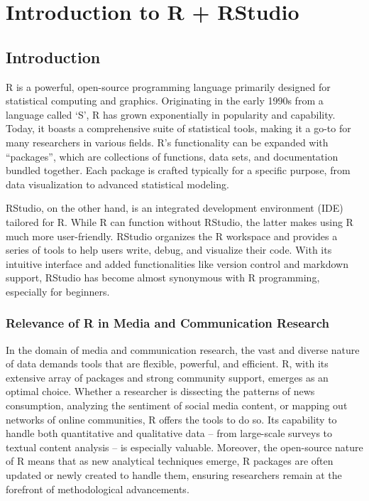 \documentclass[
  b5paper]{book}
\begin{document}
\hypertarget{introduction-to-r-rstudio}{%
\chapter{Introduction to R + RStudio}\label{introduction-to-r-rstudio}}

\hypertarget{introduction-4}{%
\section{Introduction}\label{introduction-4}}

R is a powerful, open-source programming language primarily designed for statistical computing and graphics. Originating in the early 1990s from a language called `S', R has grown exponentially in popularity and capability. Today, it boasts a comprehensive suite of statistical tools, making it a go-to for many researchers in various fields. R's functionality can be expanded with ``packages'', which are collections of functions, data sets, and documentation bundled together. Each package is crafted typically for a specific purpose, from data visualization to advanced statistical modeling.

RStudio, on the other hand, is an integrated development environment (IDE) tailored for R. While R can function without RStudio, the latter makes using R much more user-friendly. RStudio organizes the R workspace and provides a series of tools to help users write, debug, and visualize their code. With its intuitive interface and added functionalities like version control and markdown support, RStudio has become almost synonymous with R programming, especially for beginners.

\hypertarget{relevance-of-r-in-media-and-communication-research}{%
\subsection*{Relevance of R in Media and Communication Research}\label{relevance-of-r-in-media-and-communication-research}}

In the domain of media and communication research, the vast and diverse nature of data demands tools that are flexible, powerful, and efficient. R, with its extensive array of packages and strong community support, emerges as an optimal choice. Whether a researcher is dissecting the patterns of news consumption, analyzing the sentiment of social media content, or mapping out networks of online communities, R offers the tools to do so. Its capability to handle both quantitative and qualitative data -- from large-scale surveys to textual content analysis -- is especially valuable. Moreover, the open-source nature of R means that as new analytical techniques emerge, R packages are often updated or newly created to handle them, ensuring researchers remain at the forefront of methodological advancements.
\end{document}
